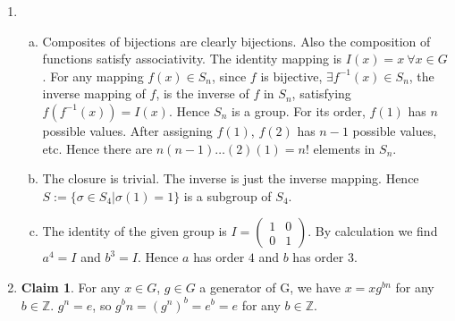 \documentclass[A4paper,12pt]{article}
\theoremstyle{definition}
\newtheorem{claim}{Claim}
\numberwithin{equation}{section}
\begin{document}
\begin{enumerate}[1)]
    \item
        \begin{enumerate}[(a)]
            \item
                Composites of bijections are clearly bijections.
                Also the composition of functions satisfy associativity.
                The identity mapping is $I(x) = x \: \forall x \in G$.
                For any mapping $f(x) \in S_n$, since $f$ is bijective, 
                $\exists f^{-1}(x) \in S_n$, the inverse mapping of $f$, is the  inverse of $f$ in $S_n$, satisfying $f(f^{-1}(x)) = I(x)$.
                Hence $S_n$ is a group. For its order, $f(1)$ has $n$ possible values. After assigning $f(1)$, $f(2)$ has $n-1$ possible values, etc. Hence there are $n(n-1)\dots(2)(1) = n!$ elements in $S_n$.
            \item
                The closure is trivial. The inverse is just the inverse mapping. Hence $S := \{\sigma \in S_4 | \sigma(1) = 1\}$ is a subgroup of $S_4$.
            \item
                The identity of the given group is $I =
                \begin{pmatrix}
                    1 & 0\\
                    0 & 1
                \end{pmatrix}
                $.
                By calculation we find $a^4 = I$ and $b^3 = I$. Hence $a$ has order $4$ and $b$ has order $3$.
        \end{enumerate}
    \item
        \begin{claim}
            For any $x \in G$, $g \in G$ a generator of G, we have $x = xg^{bn}$ for any $b \in \mathbb{Z}$.
            \proof
            $g^n = e$, so $g^bn = (g^n)^b = e^b = e$ for any $b \in \mathbb{Z}$.
        \end{claim}


\end{enumerate}
\end{document}
